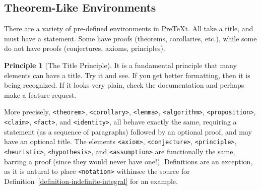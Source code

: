 \documentclass{amsart}
\theoremstyle{plain}%
\theoremstyle{definition}%
\newtheorem{principle}[theorem]{Principle}
\theoremstyle{remark}%
\newcommand{\xreffont}{\relax}
\newcommand{\mono}[1]{\texttt{#1}}
\numberwithin{equation}{section}
\begin{document}
\subsection{Theorem-Like Environments}\label{section-interesting-corollary-6}%
There are a variety of pre-defined environments in PreTeXt.  All take a title, and must have a statement.  Some have proofs (theorems, corollaries, etc.\@), while some do not have proofs (conjectures, axioms, principles).%
\begin{principle}[The Title Principle]\label{principle-principle}%
%
It is a fundamental principle that many elements can have a title.  Try it and see. If you get better formatting, then it is being recognized.  If it looks very plain, check the documentation and perhaps make a feature request.%
\end{principle}
More precisely, \mono{<theorem>}, \mono{<corollary>}, \mono{<lemma>}, \mono{<algorithm>}, \mono{<proposition>}, \mono{<claim>}, \mono{<fact>}, and \mono{<identity>}, all behave exactly the same, requiring a statement (as a sequence of paragraphs) followed by an optional proof, and may have an optional title.  The elements \mono{<axiom>}, \mono{<conjecture>}, \mono{<principle>}, \mono{<heuristic>}, \mono{<hypothesis>}, and \mono{<assumption>} are functionally the same, barring a proof (since they would never have one!).  Definitions are an exception, as it is natural to place \mono{<notation>} within\textemdash{}see the source for Definition~\hyperref[definition-indefinite-integral]{{\xreffont\ref{definition-indefinite-integral}}} for an example.%
%
%
\typeout{************************************************}
\typeout{************************************************}
%
\end{document}
